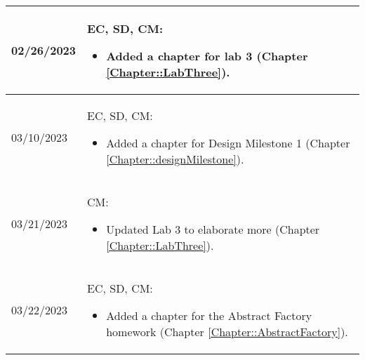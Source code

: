 \begin{longtable}{|l||p{13.5cm}|}
	02/26/2023    & EC, SD, CM:
	\begin{itemize}[topsep=0pt,itemsep=0pt,parsep=0pt,partopsep=0pt,leftmargin=12pt]
		\item Added a chapter for lab 3 (Chapter \ref{Chapter::LabThree}).
	\end{itemize}
	\\ \hline
	03/10/2023    & EC, SD, CM:
	\begin{itemize}[topsep=0pt,itemsep=0pt,parsep=0pt,partopsep=0pt,leftmargin=12pt]
		\item Added a chapter for Design Milestone 1 (Chapter \ref{Chapter::designMilestone}).
	\end{itemize}
	\\ \hline
	03/21/2023    & CM:
	\begin{itemize}[topsep=0pt,itemsep=0pt,parsep=0pt,partopsep=0pt,leftmargin=12pt]
		\item Updated Lab 3 to elaborate more (Chapter \ref{Chapter::LabThree}).
	\end{itemize}
	\\ \hline

	03/22/2023    & EC, SD, CM:
	\begin{itemize}[topsep=0pt,itemsep=0pt,parsep=0pt,partopsep=0pt,leftmargin=12pt]
		\item Added a chapter for the Abstract Factory homework (Chapter \ref{Chapter::AbstractFactory}).
	\end{itemize}
	\\ \hline
\end{longtable}